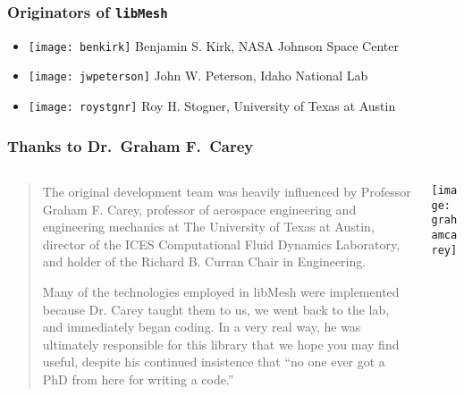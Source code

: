 \begin{frame}
  \frametitle{Originators of \texttt{libMesh}}
  \begin{block}{}
    \begin{itemize}
    \item \texttt{[image: benkirk]} Benjamin S. Kirk, NASA Johnson Space Center
    \item \texttt{[image: jwpeterson]} John W. Peterson, Idaho National Lab
    \item \texttt{[image: roystgnr]} Roy H. Stogner, University of Texas at Austin
    \end{itemize}
  \end{block}

\end{frame}

\frame
{
  \frametitle{Thanks to Dr.\ Graham F.\ Carey}

  \begin{columns}
    \begin{column}{.55\textwidth}
      \scriptsize
      \begin{quote}
        The original development team was heavily influenced by Professor Graham F. Carey, professor of aerospace engineering and engineering mechanics at The University of Texas at Austin, director of the ICES Computational Fluid Dynamics Laboratory, and holder of the Richard B. Curran Chair in Engineering.

        Many of the technologies employed in libMesh were implemented because Dr. Carey taught them to us, we went back to the lab, and immediately began coding. In a very real way, he was ultimately responsible for this library that we hope you may find useful, despite his continued insistence that ``no one ever got a PhD from here for writing a code.''
      \end{quote}
\normalsize
    \end{column}
    \begin{column}{.45\textwidth}
      \texttt{[image: grahamcarey]}
    \end{column}
  \end{columns}
}



